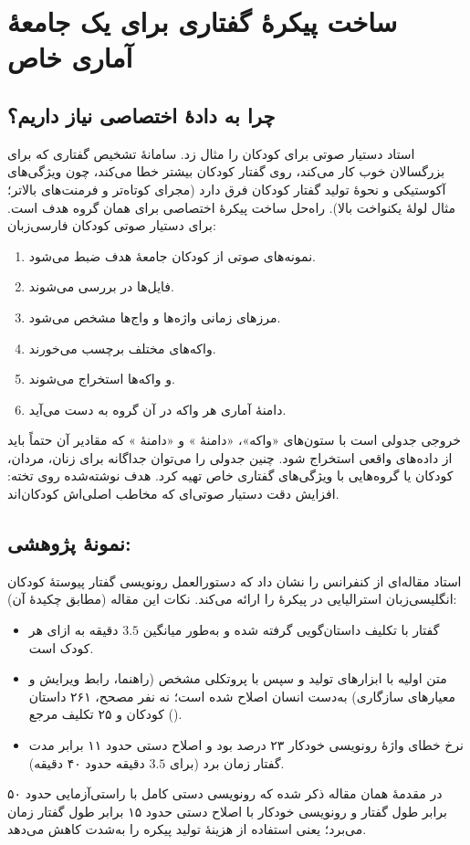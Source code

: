 \section{ساخت پیکرهٔ گفتاری برای یک جامعهٔ آماری خاص}
\subsection{چرا به دادهٔ اختصاصی نیاز داریم؟}
استاد دستیار صوتی برای کودکان را مثال زد. سامانهٔ تشخیص گفتاری که برای بزرگسالان خوب کار می‌کند، روی گفتار کودکان بیشتر خطا می‌کند، چون ویژگی‌های آکوستیکی و نحوهٔ تولید گفتار کودکان فرق دارد (مجرای کوتاه‌تر و فرمنت‌های بالاتر؛ مثال لولهٔ یکنواخت بالا). راه‌حل ساخت پیکرهٔ اختصاصی برای همان گروه هدف است. برای دستیار صوتی کودکان فارسی‌زبان:
\begin{enumerate}
  \item نمونه‌های صوتی از کودکان جامعهٔ هدف ضبط می‌شود.
  \item فایل‌ها در  بررسی می‌شوند.
  \item مرزهای زمانی واژه‌ها و واج‌ها مشخص می‌شود.
  \item واکه‌های مختلف برچسب می‌خورند.
  \item {} و  واکه‌ها استخراج می‌شوند.
  \item دامنهٔ آماری هر واکه در آن گروه به دست می‌آید.
\end{enumerate}
خروجی جدولی است با ستون‌های «واکه»، «دامنهٔ » و «دامنهٔ » که مقادیر آن حتماً باید از داده‌های واقعی استخراج شود. چنین جدولی را می‌توان جداگانه برای زنان، مردان، کودکان یا گروه‌هایی با ویژگی‌های گفتاری خاص تهیه کرد. هدف نوشته‌شده روی تخته: افزایش دقت دستیار صوتی‌ای که مخاطب اصلی‌اش کودکان‌اند.

\subsection{نمونهٔ پژوهشی: }
استاد مقاله‌ای از کنفرانس  را نشان داد که دستورالعمل رونویسی گفتار پیوستهٔ کودکان انگلیسی‌زبان استرالیایی در پیکرهٔ  را ارائه می‌کند. نکات این مقاله (مطابق چکیدهٔ آن):
\begin{itemize}
  \item گفتار با تکلیف داستان‌گویی گرفته شده و به‌طور میانگین $3.5$ دقیقه به ازای هر کودک است.
  \item متن اولیه با ابزارهای  تولید و سپس با پروتکلی مشخص (راهنما، رابط ویرایش و معیارهای سازگاری) به‌دست انسان اصلاح شده است؛ نه نفر مصحح، ۲۶۱ داستان کودکان و ۲۵ تکلیف مرجع ().
  \item نرخ خطای واژهٔ رونویسی خودکار ۲۳ درصد بود و اصلاح دستی حدود ۱۱ برابر مدت گفتار زمان برد (برای $3.5$ دقیقه حدود ۴۰ دقیقه).
\end{itemize}
در مقدمهٔ همان مقاله ذکر شده که رونویسی دستی کامل با راستی‌آزمایی حدود ۵۰ برابر طول گفتار و رونویسی خودکار با اصلاح دستی حدود ۱۵ برابر طول گفتار زمان می‌برد؛ یعنی استفاده از  هزینهٔ تولید پیکره را به‌شدت کاهش می‌دهد.

